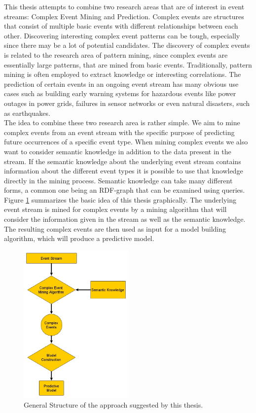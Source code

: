 This thesis attempts to combine two research areas that are of interest in event streams: Complex Event Mining and Prediction. Complex events are structures that consist of multiple basic events with different relationships between each other. Discovering interesting complex event patterns can be tough, especially since there may be a lot of potential candidates. The discovery of complex events is related to the research area of pattern mining, since complex events are essentially large patterns, that are mined from basic events. Traditionally, pattern mining is often employed to extract knowledge or interesting correlations. The prediction of certain events in an ongoing event stream has many obvious use cases such as building early warning systems for hazardous events like power outages in power grids, failures in sensor networks or even natural disasters, such as earthquakes. \\
The idea to combine these two research area is rather simple. We aim to mine complex events from an event stream with the specific purpose of predicting future occurrences of a specific event type. When mining complex events we also want to consider semantic knowledge in addition to the data present in the stream. If the semantic knowledge about the underlying event stream contains information about the different event types it is possible to use that knowledge directly in the mining process. Semantic knowledge can take many different forms, a common one being an RDF-graph that can be examined using queries. \newline
Figure \ref{fig_approach} summarizes the basic idea of this thesis graphically. The underlying event stream is mined for complex events by a mining algorithm that will consider the information given in the stream as well as the semantic knowledge. The resulting complex events are then used as input for a model building algorithm, which will produce a predictive model.
\begin{figure}[h]
	\centering
  	\includegraphics[width=0.5\textwidth]{approach.jpg}
	\caption{General Structure of the approach suggested by this thesis.}
	\label{fig_approach}
\end{figure}

